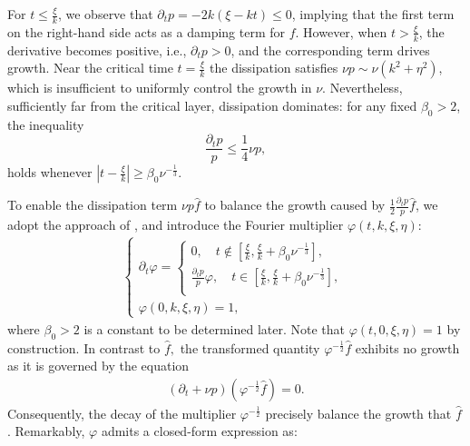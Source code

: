 \documentclass[11pt,reqno]{article}
\numberwithin{equation}{section}
\let\pa=\partial
\let\f=\frac
\begin{document}
For $t\leq \f{\xi}{k}$, we observe that $\pa_{t}p=-2k(\xi-kt)\leq 0$, implying that the first term on the right-hand side acts as a damping term for $f$.
However, when $t> \f{\xi}{k}$, the derivative becomes positive, i.e., $\pa_{t}p> 0$, and the corresponding term drives growth.
Near the critical time $t=\f{\xi}{k}$ the dissipation satisfies $\nu p\sim\nu (k^2+\eta^2)$, which is insufficient to uniformly control the growth in $\nu$.
Nevertheless, sufficiently far from the critical layer, dissipation dominates:  for any fixed $\beta_0>2$,  the inequality
$$\f{\pa_{t}p}{p}\leq \f{1}{4}\nu p,$$
holds whenever $|t-\f{\xi}{k}|\geq \beta_0 \nu^{-\f13}$.	


To enable the dissipation term $\nu p \hat{f}$ to balance the growth caused by $\f12\f{\pa_{t}p}{p}\hat{f}$, we adopt the approach of \cite{Bedrossian-Germain-Masmoudi-2017,Liss-2020}, and introduce the Fourier multiplier $\varphi(t,k,\xi,\eta)$:
\begin{align}\label{def-phi}
\left\{\begin{array}{l}
	\partial_{t} \varphi = 
	\left\{\begin{array}{l}
		0,\quad t\not\in [\f{\xi}{k},\f{\xi}{k}+\beta_0\nu^{-\f13}],\\[1ex]
		\f{\pa_{t} p}{p}\varphi	,\quad t\in [\f{\xi}{k},\f{\xi}{k}+\beta_0\nu^{-\f13}],\\[1ex]
	\end{array}\right.\\
	\varphi(0,k,\xi,\eta)=1,
\end{array}\right.
\end{align}
where $\beta_0>2$ is a constant to be determined later. 
Note that $\varphi(t,0,\xi,\eta)=1$ by construction. 
In contrast to $\hat{f},$ 
the transformed quantity $\varphi^{-\f12}\hat{f}$ exhibits no growth as it is governed by the equation 
\begin{align*}
(\pa_t +\nu p )(\varphi^{-\f12}\hat{f})=0.
\end{align*}
Consequently, the decay of the multiplier $\varphi^{-\f12}$ precisely balance the growth that $\hat{f}$.
Remarkably, $\varphi$ admits a closed-form expression as:
\end{document}
